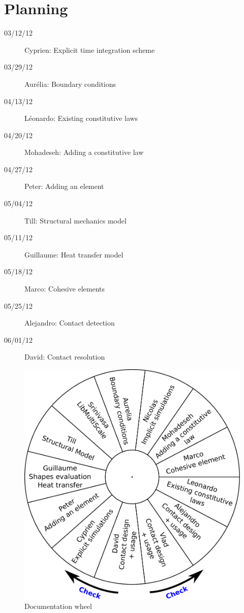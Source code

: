 \documentclass[a4paper,11pt]{book}
\begin{document}

\chapter{Planning}

\begin{description}
\item[03/12/12] Cyprien: Explicit time integration scheme
\item[03/29/12] Aur\'elia: Boundary conditions
\item[04/13/12] L\'eonardo: Existing constitutive laws
\item[04/20/12] Mohadeseh: Adding a constitutive law
\item[04/27/12] Peter: Adding an element
\item[05/04/12] Till: Structural mechanics model
\item[05/11/12] Guillaume: Heat transfer model
\item[05/18/12] Marco: Cohesive elements
\item[05/25/12] Alejandro: Contact detection
\item[06/01/12] David: Contact resolution
\end{description}

\begin{figure}[!htb]
  \centering
  \includegraphics[width=\linewidth]{figures/doc_wheel}
  \caption{Documentation wheel\label{fig:doc_wheel}}
\end{figure}
\end{document}

